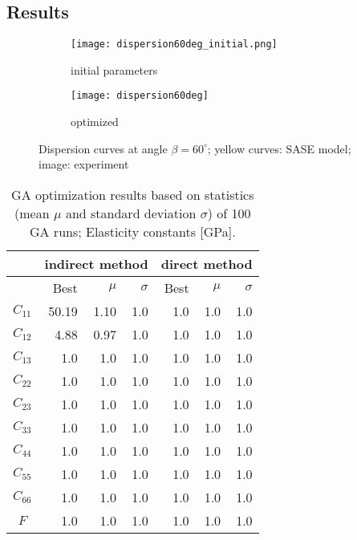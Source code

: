 \documentclass[preprint,12pt]{elsarticle}
\begin{document}
	\subsection{Results}
	\begin{figure} [h!]
		\centering
		\begin{subfigure}[b]{\textwidth}
			\centering
			\texttt{[image: dispersion60deg\_initial.png]}
			\caption{initial parameters}
			\label{fig:dispersion60deg_initial}
		\end{subfigure}
		\begin{subfigure}[b]{\textwidth}
			\centering
			\texttt{[image: dispersion60deg]}
			\caption{optimized}
			\label{fig:dispersion60deg}
		\end{subfigure}
	\caption{Dispersion curves at angle $\beta = 60^{\circ}$; yellow curves: SASE model; image: experiment }
	\label{fig:initial_optimized}
	\end{figure}
\clearpage

 \begin{table}[h]
	\renewcommand{\arraystretch}{1.3}
	\centering \footnotesize
	\caption{GA optimization results based on statistics (mean $\mu$ and standard deviation $\sigma$) of 100 GA runs; Elasticity constants [GPa].}
	\begin{tabular}{crrrrrr} 
		\toprule
		&\multicolumn{3}{c}{\textbf{indirect method} }	& \multicolumn{3}{c}{\textbf{direct method} }  \\ 
		\midrule
		&Best & $\mu$ & $\sigma$& Best& $\mu$ & $\sigma$\\
		\cmidrule(lr){2-4} \cmidrule(lr){5-7} 
		$C_{11}$&50.19&1.10& 1.0  & 1.0  & 1.0 & 1.0 \\ 
		$C_{12}$&4.88&0.97& 1.0  & 1.0  & 1.0 & 1.0 \\ 
		$C_{13}$&1.0&1.0& 1.0  & 1.0  & 1.0 & 1.0 \\ 
		$C_{22}$&1.0&1.0& 1.0  & 1.0  & 1.0 & 1.0 \\ 
		$C_{23}$&1.0&1.0& 1.0  & 1.0  & 1.0 & 1.0 \\ 
		$C_{33}$&1.0&1.0& 1.0  & 1.0  & 1.0 & 1.0 \\ 
		$C_{44}$&1.0&1.0& 1.0  & 1.0  & 1.0 & 1.0 \\ 
		$C_{55}$&1.0&1.0& 1.0  & 1.0  & 1.0 & 1.0 \\ 
		$C_{66}$&1.0&1.0& 1.0  & 1.0  & 1.0 & 1.0 \\ 
		$F$          &1.0&1.0& 1.0  & 1.0  & 1.0 & 1.0 \\ 
		\bottomrule 
	\end{tabular} 
	\label{tab:results}
\end{table}
\end{document}
